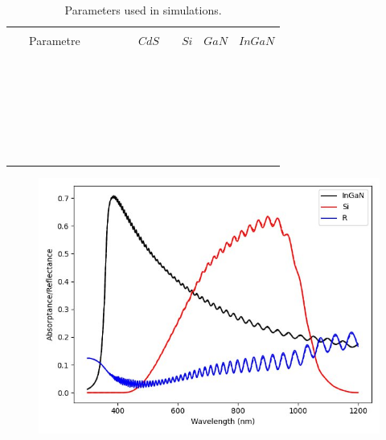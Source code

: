\documentclass[preprint,12pt]{elsarticle}
\begin{document}
\begin{table}[!ht]
	\centering
	\begin{tabular}{llllll} \hline \\
		
		&~Parametre ~~~~~&~~ $CdS$~~& $Si$ & $GaN$ & $InGaN$ \\ \\ \hline \\ 
		&   &  &   & \\ \\
		&   &  &   & \\ \\
		&   &  &   & \\ \\
		&   &  &   & \\ \\
		&   &  &   & \\ \\
		&   &  &   & \\ \\
		
		&   &  &   & \\ \\
		&   &  &   & \\ \\
		&   &  &   & \\ \\
		
		&  &  &    & \\ \\
		&  &  &    & \\ \\
		&  &  &    & \\ \\ 	\hline \\ 
	\end{tabular}
	\caption{Parameters used in simulations.}
\end{table}

\begin{figure}[h!]
	\centering
	\includegraphics[width=0.7\linewidth, height=0.25\textheight]{Figure/Abs_Ref}
	\caption{}
	\label{fig:absref}
\end{figure}
\end{document}
